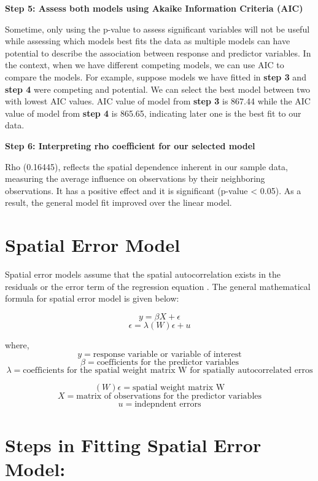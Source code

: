 \documentclass[
]{book}
\begin{document}
\textbf{Step 5: Assess both models using Akaike Information Criteria (AIC)}

Sometime, only using the p-value to assess significant variables will not be useful while assessing which models best fits the data as multiple models can have potential to describe the association between response and predictor variables. In the context, when we have different competing models, we can use AIC \citep[for details see,][]{Akaike1973} to compare the models. For example, suppose models we have fitted in \textbf{step 3} and \textbf{step 4} were competing and potential. We can select the best model between two with lowest AIC values. AIC value of model from \textbf{step 3} is 867.44 while the AIC value of model from \textbf{step 4} is 865.65, indicating later one is the best fit to our data.

\textbf{Step 6: Interpreting rho coefficient for our selected model}

Rho (0.16445), reflects the spatial dependence inherent in our sample data, measuring the average influence on observations by their neighboring observations. It has a positive effect and it is significant (p-value \textless{} 0.05). As a result, the general model fit improved over the linear model.

\hypertarget{spatial-error-model}{%
\section{Spatial Error Model}\label{spatial-error-model}}

Spatial error models assume that the spatial autocorrelation exists in the residuals or the error term of the regression equation \citep{Anselin1998}. The general mathematical formula for spatial error model is given below:

\[ y=\beta X + \epsilon\]
\[\epsilon= \lambda (W)\epsilon+ u\]

where, \[y= \text{response variable or variable of interest}\]
\[\beta= \text{coefficients for the predictor variables}\]
\[\lambda= \text{coefficients for the spatial weight matrix W for spatially autocorrelated erros}\]

\[(W)\epsilon=\text{spatial weight matrix W}\]
\[X=\text{matrix of observations for the predictor variables}\]
\[u=\text{indepndent errors}\]

\hypertarget{steps-in-fitting-spatial-error-model}{%
\section{Steps in Fitting Spatial Error Model:}\label{steps-in-fitting-spatial-error-model}}
\end{document}
